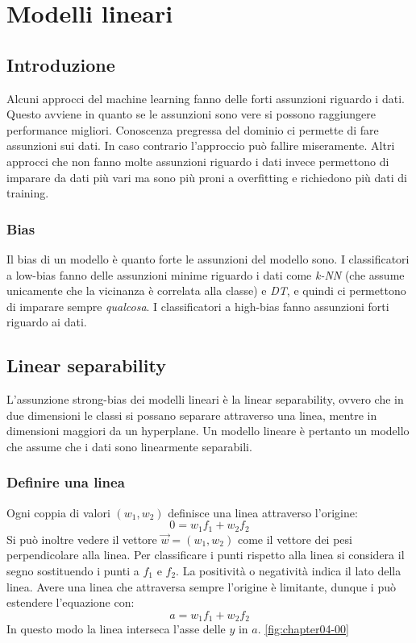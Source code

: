 \chapter{Modelli lineari}

\section{Introduzione}
Alcuni approcci del machine learning fanno delle forti assunzioni riguardo i dati.
Questo avviene in quanto se le assunzioni sono vere si possono raggiungere performance migliori. Conoscenza pregressa del dominio ci permette di fare assunzioni sui dati.
In caso contrario l'approccio pu\`o fallire miseramente.
Altri approcci che non fanno molte assunzioni riguardo i dati invece permettono di imparare da dati pi\`u vari ma sono pi\`u proni a overfitting e richiedono pi\`u dati di training.

	\subsection{Bias}
	Il bias di un modello \`e quanto forte le assunzioni del modello sono.
	I classificatori a low-bias fanno delle assunzioni minime riguardo i dati come \emph{k-NN} (che assume unicamente che la vicinanza \`e correlata alla classe) e \emph{DT}, e quindi ci permettono di imparare sempre \emph{qualcosa}.
	I classificatori a high-bias fanno assunzioni forti riguardo ai dati.

\section{Linear separability}
L'assunzione strong-bias dei modelli lineari \`e la linear separability, ovvero che in due dimensioni le classi si possano separare attraverso una linea, mentre in dimensioni maggiori da un hyperplane.
Un modello lineare \`e pertanto un modello che assume che i dati sono linearmente separabili. 

	\subsection{Definire una linea}
	Ogni coppia di valori $(w_1,w_2)$ definisce una linea attraverso l'origine:
	$$0=w_1f_1+w_2f_2$$
	Si pu\`o inoltre vedere il vettore $\overrightarrow{w}=(w_1, w_2)$ come il vettore dei pesi perpendicolare alla linea.
	Per classificare i punti rispetto alla linea si considera il segno sostituendo i punti a $f_1$ e $f_2$.
	La positivit\`a o negativit\`a indica il lato della linea.
	Avere una linea che attraversa sempre l'origine è limitante, dunque i pu\`o estendere l'equazione con:
	$$a=w_1f_1+w_2f_2$$
	In questo modo la linea interseca l'asse delle $y$ in $a$. \ref{fig:chapter04-00}

